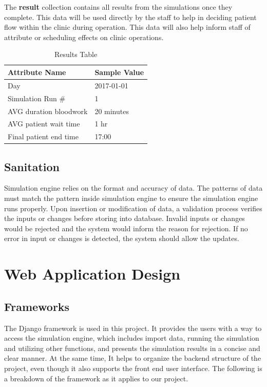 \documentclass[12pt]{article}
\begin{document}
The \textbf{result} collection contains all results from the simulations once they complete. This data will be used directly by the staff to help in deciding patient flow within the clinic during operation. This data will also help inform staff of attribute or scheduling effects on clinic operations.
\begin{table}[H]
\centering
\caption{Results Table}
\label{result-table}
\begin{tabular}{|l|l|}
\hline
Attribute Name         & Sample Value \\ \hline
Day                    & 2017-01-01   \\ \hline
Simulation Run \#      & 1            \\ \hline
AVG duration bloodwork & 20 minutes   \\ \hline
AVG patient wait time  & 1 hr         \\ \hline
Final patient end time & 17:00        \\ \hline
\end{tabular}
\end{table}
\hfill

\subsection{Sanitation}
Simulation engine relies on the format and accuracy of data. The patterns of data must match the pattern inside simulation engine to ensure the simulation engine runs properly. Upon insertion or modification of data, a validation process verifies the inputs or changes before storing into database. Invalid inputs or changes would be rejected and the system would inform the reason for rejection. If no error in input or changes is detected, the system should allow the updates. 


\section{Web Application Design}

\subsection{Frameworks}
The Django framework is used in this project. It provides the users with a way to access the simulation engine, which includes import data, running the simulation and utilizing other functions, and presents the simulation results in a concise and clear manner. At the same time, It helps to organize the backend structure of the project, even though it also supports the front end user interface. The following is a breakdown of the framework as it applies to our project.
\end{document}
